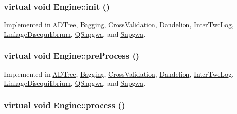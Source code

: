\hypertarget{classEngine_aaa054d596fb8ced6e3eb4bee208f8c3d}{
\subsubsection[{init}]{\setlength{\rightskip}{0pt plus 5cm}virtual void Engine::init ()}}
\label{classEngine_aaa054d596fb8ced6e3eb4bee208f8c3d}


Implemented in \hyperlink{classADTree_a70b34e300c187fb817bc6d8ba31aceaa}{ADTree}, \hyperlink{classBagging_ab58c678f776356ae4b4c1c41dcdf3778}{Bagging}, \hyperlink{classCrossValidation_acf88bf85dec8d27f6aa97d9ec04ccf26}{CrossValidation}, \hyperlink{classDandelion_a6c58019c7b1d8fb5a80c2031afb01374}{Dandelion}, \hyperlink{classInterTwoLog_af5dbc57497069c182c6101211fe2b64a}{InterTwoLog}, \hyperlink{classLinkageDisequilibrium_a9d3c50f9b7c3f5739ce12eb0b2068c6c}{LinkageDisequilibrium}, \hyperlink{classQSnpgwa_ac228fcbfcba981d48a223e911673e406}{QSnpgwa}, and \hyperlink{classSnpgwa_a4d061e98cd1a9b5d9f7d666dea3cd0af}{Snpgwa}.

\hypertarget{classEngine_aec7076b8979a13c96eceb362437dc68c}{
\subsubsection[{preProcess}]{\setlength{\rightskip}{0pt plus 5cm}virtual void Engine::preProcess ()}}
\label{classEngine_aec7076b8979a13c96eceb362437dc68c}


Implemented in \hyperlink{classADTree_a18b7ad4befedb9073a83c39106628d3b}{ADTree}, \hyperlink{classBagging_a638e97695ee9a685cfee7ce459c2b8f8}{Bagging}, \hyperlink{classCrossValidation_ad45dad478f034a39696660d7c93b34fa}{CrossValidation}, \hyperlink{classDandelion_a21fa4068a4293d3c5068d53627e49393}{Dandelion}, \hyperlink{classInterTwoLog_a581fcf71571bce5c0861e963c16f220b}{InterTwoLog}, \hyperlink{classLinkageDisequilibrium_a2f466153298f2c868a78b5573f6c5048}{LinkageDisequilibrium}, \hyperlink{classQSnpgwa_acc9e7d7e48d9c3e2fbb0a75e263f0c50}{QSnpgwa}, and \hyperlink{classSnpgwa_aa20dc165d74036ff401ca182f5e980c2}{Snpgwa}.

\hypertarget{classEngine_a005f8e277c3dea16ea05803fba223db7}{
\subsubsection[{process}]{\setlength{\rightskip}{0pt plus 5cm}virtual void Engine::process ()}}
\label{classEngine_a005f8e277c3dea16ea05803fba223db7}


